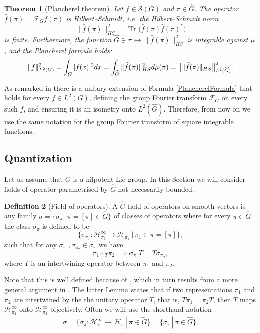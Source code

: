 \documentclass[12pt,oneside,a4paper]{book}
\numberwithin{equation}{section}     %
\theoremstyle{plain}
\newtheorem{theorem}{Theorem}[section]
\theoremstyle{definition}
\newtheorem{definition}[theorem]{Definition}
\DeclareMathOperator{\Tr}{Tr}
\begin{document}
\begin{theorem}[Plancherel theorem]\label{Thm:Plancherelformula}
	Let $f\in\mathcal{S}(G)$ and $\pi\in\widehat{G}$. The operator $\widehat{f}(\pi)=\mathcal{F}_Gf(\pi)$ is Hilbert--Schmidt, i.e. the Hilbert--Schmidt norm
	$$\|\widehat{f}(\pi)\|_{HS}^2=\Tr\big(\widehat{f}(\pi)\widehat{f}(\pi)^*\big)$$
	is finite. Furthermore, the function $\widehat{G}\ni\pi\mapsto\|\widehat{f}(\pi)\|^2_{HS}$ is integrable against $\mu$, and the Plancherel formula holds:
	\begin{align}\label{PlancherelFormula}
	\|f\|^2_{L^2(G)}=\int_G|f(x)|^2dx=\int_{\widehat{G}}\|\widehat{f}(\pi)\|^2_{HS}d\mu(\pi)=\big{\|}\|\widehat{f}(\pi)\|_{HS}\big{\|}^2_{L^2(\widehat{G})}.
	\end{align} 
\end{theorem}
As remarked in \cite[Theorem 1.8.11]{FR2016} there is a unitary extension of Formula \eqref{PlancherelFormula} that holds for every $f\in L^2(G)$, defining the group Fourier transform $\mathcal{F}_G$ on every such $f$, and ensuring it is an isometry onto $L^2(\widehat G)$. Therefore, from now on we use the same notation for the group Fourier transform of square integrable functions.

\subsection{Quantization}\label{SEC:quantization}
Let us assume that $G$ is a nilpotent Lie group. In this Section we will consider fields of operator parametrised by $\widehat G$ not necessarily bounded.

\begin{definition}[Field of operators]  \cite[Definition 1.8.14]{FR2016}
	A $\widehat G$-field of operators on smooth vectors is any family $\sigma=\{\sigma_\pi\,|\,\pi=[\pi]\in\widehat G \}$ of classes of operators where for every $\pi \in \widehat G$ the class $\sigma_\pi$ is defined to be
	\[
	\{\sigma_{\pi_1}:\mathcal H_{\pi_1}^\infty \rightarrow \mathcal H_{\pi_1} \,|\, \pi_1\in\pi=[\pi]\},
	\]
	such that for any $\sigma_{\pi_1},\sigma_{\pi_2}\in\sigma_{\pi}$ we have
	\[
	\pi_1\sim_T\pi_2 \implies \sigma_{\pi_1}T=T\sigma_{\pi_2},
	\]
	where $T$ is an intertwining operator between $\pi_1$ and $\pi_2$. 
\end{definition}
Note that this is well defined because of \cite[Lemma 1.8.12.]{FR2016}, which in turn results from a more general argument in \cite{DM78}.  The latter Lemma states that if two representations $\pi_1$ and $\pi_2$ are intertwined by the the unitary operator $T$, that is, $T\pi_1=\pi_2 T$, then $T$ maps $\mathcal{H}_{\pi_1}^\infty$ onto $\mathcal{H}_{\pi_2}^\infty$ bijectively. Often we will use the shorthand notation
\begin{align*}
\sigma=\{\sigma_{\pi}:\mathcal{H}_\pi^\infty\rightarrow\mathcal{H}_\pi\,|\,\pi\in\widehat{G}\}=\{\sigma_{\pi}\,|\,\pi\in\widehat{G}\}.
\end{align*}
\end{document}
